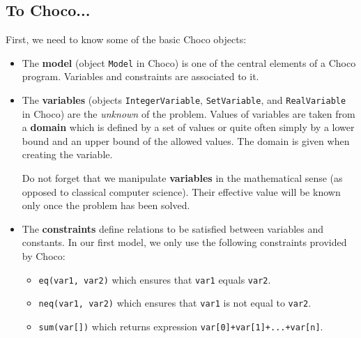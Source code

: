 \subsection{To Choco...}\label{introduction:inchoco}\hypertarget{introduction:inchoco}{}

First, we need to know some of the basic Choco objects:
\begin{itemize}
\item 
The \textbf{model} (object \texttt{Model} in Choco) is one of the central elements of a Choco program. Variables and constraints are associated to it.
\item
The \textbf{variables} (objects \texttt{IntegerVariable}, \texttt{SetVariable}, and \texttt{RealVariable} in Choco) are the \emph{unknown} of the problem. Values of variables are taken from a \textbf{domain} which is defined by a set of values or quite often simply by a lower bound and an upper bound of the allowed values. The domain is given when creating the variable.
\begin{note}
Do not forget that we manipulate \textbf{variables} in the mathematical sense (as opposed to classical computer science). Their effective value will be known only once the problem has been solved.
\end{note}
\item
The \textbf{constraints} define relations to be satisfied between variables and constants.
In our first model, we only use the following constraints provided by Choco:
\begin{itemize}
	\item \texttt{eq(var1, var2)} which ensures that \texttt{var1} equals \texttt{var2}.
	\item \texttt{neq(var1, var2)} which ensures that \texttt{var1} is not equal to \texttt{var2}.
	\item \texttt{sum(var[])} which returns expression \texttt{var[0]+var[1]+...+var[n]}.
\end{itemize}
\end{itemize}

